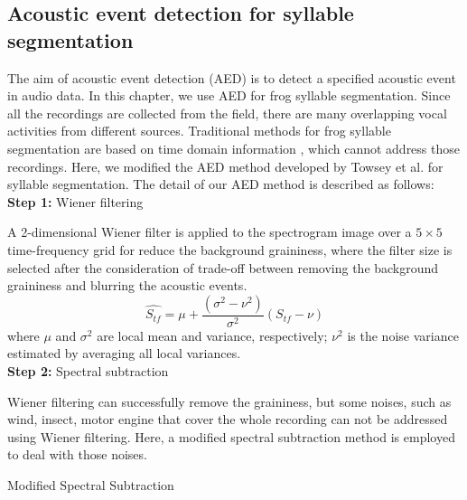 \subsection{Acoustic event detection for syllable segmentation}
The aim of acoustic event detection (AED) is to detect a specified acoustic event in audio data. In this chapter, we use AED for frog syllable segmentation. Since all the recordings are collected from the field, there are many overlapping vocal activities from different sources. Traditional methods for frog syllable segmentation are based on time domain information \cite{somervuo2004classification,huang2009frog}, which cannot address those recordings. Here, we modified the AED method developed by Towsey et al. \cite{towsey2012toolbox} for syllable segmentation. The detail of our AED method is described as follows:
\\
\textbf{Step 1:} Wiener filtering 

\noindent A 2-dimensional Wiener filter is applied to the spectrogram image over a $5 \times 5$ time-frequency grid for reduce the background graininess, where the filter size is selected after the consideration of trade-off between removing the background graininess and blurring the acoustic events.
\begin{equation}
\hat{S_{tf}} = \mu + \frac{(\sigma^{2}-\nu^{2})}{\sigma^{2}}(S_{tf}-\nu)
\end{equation}
where $\mu$ and $\sigma^{2}$ are local mean and variance, respectively; $\nu^{2}$ is the noise variance estimated by averaging all local variances. 
\\
\textbf{Step 2:} Spectral subtraction

\noindent Wiener filtering can successfully remove the graininess, but some noises, such as wind,
insect, motor engine that cover the whole recording can not be addressed using Wiener filtering. Here, a modified spectral subtraction method is employed to deal with those noises. 


\begin{algorithm}
\DontPrintSemicolon
{}

\caption{Modified Spectral Subtraction\label{IR}}

\end{algorithm}

